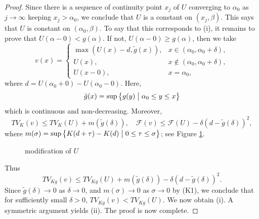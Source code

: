 \documentclass[10pt,a4paper]{amsart}
\begin{document}
\begin{proof}
Since there is a sequence of continuity point $x_j$ of $U$ converging to $\alpha_0$ as $j\to\infty$ keeping $x_j>\alpha_0$, we conclude that $U$ is a constant on $(x_j,\beta)$.
 This says that $U$ is constant on $(\alpha_0,\beta)$.
 To say that this corresponds to (i), it remains to prove that $U(\alpha-0)<g(\alpha)$.
 If not, $U(\alpha-0)\geq g(\alpha)$, then we take
\[
	v(x) = \left\{
\begin{array}{ll}
	\max \left( U(x) - d, \tilde{g}(x) \right), & x \in (\alpha_0, \alpha_0+\delta), \\
	U(x), & x \notin (\alpha_0, \alpha_0+\delta), \\
	U(x-0), & x = \alpha_0,
\end{array}
\right.
\]
where $d=U(\alpha_0+0)-U (\alpha_0-0)$.
 Here,
\[
	\tilde{g}(x) = \sup \left\{ g(y) \bigm|
	\alpha_0 \le y \le x \right\}
\]
which is continuous and non-decreasing.
 Moreover,
\[
	TV_K(v) \leq TV_K(U) + m\left(\tilde{g}(\delta)\right), \quad
	\mathcal{F}(v) \leq \mathcal{F}(U)
	- \delta \left(d-\tilde{g}(\delta)\right)^2,
\]
where $m(\sigma)=\sup\left\{ K(d+\tau)-K(d) \bigm| 0\leq\tau\leq\sigma\right\}$; see Figure \ref{Fmod}.
\begin{figure}[tb]
\centering 

\caption{modification of $U$\label{Fmod}}
\end{figure}
Thus
\[
	TV_{Kg}(v) \leq TV_{Kg}(U) + m\left(\tilde{g}(\delta)\right) - \delta\left(d-\tilde{g}(\delta)\right)^2.
\]
Since $\tilde{g}(\delta)\to0$ as $\delta\to0$, and $m(\sigma)\to0$ as $\sigma\to0$ by (K1), we conclude that for sufficiently small $\delta>0$, $TV_{Kg}(v)<TV_{Kg}(U)$.
 We now obtain (i).
 A symmetric argument yields (i\hspace{-1pt}i).
 The proof is now complete.
\end{proof}
\end{document}
